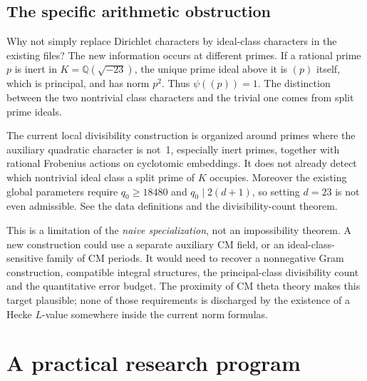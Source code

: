 \documentclass[11pt,letterpaper]{article}
\theoremstyle{definition}\newtheorem{definition}[theorem]{Definition}
\theoremstyle{remark}\newtheorem{remark}[theorem]{Remark}
\newcommand{\Q}{\mathbb Q}\newcommand{\R}{\mathbb R}\newcommand{\C}{\mathbb C}
\begin{document}
\subsection{The specific arithmetic obstruction}
Why not simply replace Dirichlet characters by ideal-class characters in the existing files?
The new information occurs at different primes. If a rational prime $p$ is inert in
$K=\Q(\sqrt{-23})$, the unique prime ideal above it is $(p)$ itself, which is principal,
and has norm $p^2$. Thus $\psi((p))=1$. The distinction between the two nontrivial class
characters and the trivial one comes from split prime ideals.

The current local divisibility construction is organized around primes where the auxiliary
quadratic character is not~1, especially inert primes, together with rational Frobenius actions
on cyclotomic embeddings. It does not already detect which nontrivial ideal class a split
prime of $K$ occupies. Moreover the existing global parameters require
$q_0\ge18480$ and $q_0\mid2(d+1)$, so setting $d=23$ is not even admissible.
See the data definitions and the divisibility-count theorem.\cite{fields,divisibility}

This is a limitation of the \emph{naive specialization}, not an impossibility theorem.
A new construction could use a separate auxiliary CM field, or an ideal-class-sensitive
family of CM periods. It would need to recover a nonnegative Gram construction, compatible
integral structures, the principal-class divisibility count and the quantitative error budget.
The proximity of CM theta theory makes this target plausible; none of those requirements
is discharged by the existence of a Hecke $L$-value somewhere inside the current norm formulas.

\section{A practical research program}
\end{document}
